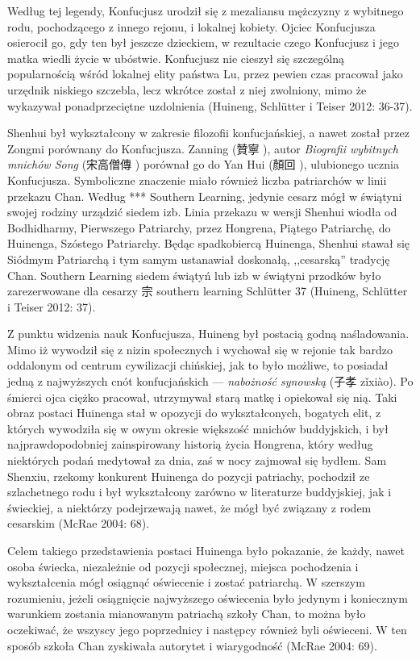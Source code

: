 Według tej legendy, Konfucjusz urodził się z mezaliansu mężczyzny z wybitnego rodu, pochodzącego z innego rejonu, i lokalnej kobiety. Ojciec Konfucjusza osierocił go, gdy ten był jeszcze dzieckiem, w rezultacie czego Konfucjusz i jego matka wiedli życie w ubóstwie. Konfucjusz nie cieszył się szczególną popularnością wśród lokalnej elity państwa Lu, przez pewien czas pracował jako urzędnik niskiego szczebla, lecz wkrótce został z niej zwolniony, mimo że wykazywał ponadprzeciętne uzdolnienia (Huineng, Schlütter i Teiser 2012: 36-37).

Shenhui był wykształcony w zakresie filozofii konfucjańskiej, a nawet został przez Zongmi porównany do Konfucjusza. Zanning (贊寧 ), autor \textit{Biografii wybitnych mnichów Song} (宋高僧傳 ) porównał go do Yan Hui (顏回 ), ulubionego ucznia Konfucjusza.
Symboliczne znaczenie miało również liczba patriarchów w linii przekazu Chan. Według *** Southern Learning, jedynie cesarz mógł w świątyni swojej rodziny urządzić siedem izb. Linia przekazu w wersji Shenhui wiodła od Bodhidharmy, Pierwszego Patriarchy, przez Hongrena, Piątego Patriarchę, do Huinenga, Szóstego Patriarchy. Będąc spadkobiercą Huinenga, Shenhui stawał się Siódmym Patriarchą i tym samym ustanawiał doskonałą, ,,cesarską'' tradycję Chan.
Southern Learning
siedem świątyń lub izb w świątyni przodków było zarezerwowane dla cesarzy
宗
southern learning
Schlütter 37 \fi
(Huineng, Schlütter i Teiser 2012: 37).

Z punktu widzenia nauk Konfucjusza, Huineng był postacią godną naśladowania. Mimo iż wywodził się z nizin społecznych i wychował się w rejonie tak bardzo oddalonym od centrum cywilizacji chińskiej, jak to było możliwe, to posiadał jedną z najwyższych cnót konfucjańskich --- \textit{nabożność synowską} (子孝 {zǐxiào}). Po śmierci ojca ciężko pracował, utrzymywał starą matkę i opiekował się nią. Taki obraz postaci Huinenga stał w opozycji do wykształconych, bogatych elit, z których wywodziła się w owym okresie większość mnichów buddyjskich, i był najprawdopodobniej zainspirowany historią życia Hongrena, który według niektórych podań medytował za dnia, zaś w nocy zajmował się bydłem. Sam Shenxiu, rzekomy konkurent Huinenga do pozycji patriachy, pochodził ze szlachetnego rodu i był wykształcony zarówno w literaturze buddyjskiej, jak i świeckiej, a niektórzy podejrzewają nawet, że mógł być związany z rodem cesarskim (McRae 2004: 68).

Celem takiego przedstawienia postaci Huinenga było pokazanie, że każdy, nawet osoba świecka, niezależnie od pozycji społecznej, miejsca pochodzenia i wykształcenia mógł osiągnąć oświecenie i zostać patriarchą. W szerszym rozumieniu, jeżeli osiągnięcie najwyższego oświecenia było jedynym i koniecznym warunkiem zostania mianowanym patriachą szkoły Chan, to można było oczekiwać, że wszyscy jego poprzednicy i następcy również byli oświeceni. W ten sposób szkoła Chan zyskiwała autorytet i wiarygodność (McRae 2004: 69).
